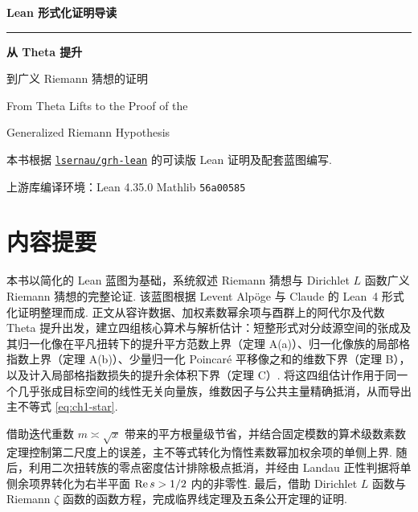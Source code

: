 \begin{titlepage}
\thispagestyle{empty}
\sffamily
\setlength{\parindent}{0pt}
\vspace*{0.02\textheight}

{\large\bfseries\color{DefinitionInk} Lean 形式化证明导读\par}
\vspace{0.55em}
{\color{DefinitionInk}\rule{27mm}{1pt}\par}
\vspace{1.35em}

{\fontsize{29pt}{38pt}\linespread{1.08}\selectfont\bfseries\color{OxfordNavy}
 从 Theta 提升\par
 到广义 Riemann 猜想的证明\par}
\vspace{0.75em}

{\Large\rmfamily\color{SlateInk}
 From Theta Lifts to the Proof of the\par
 Generalized Riemann Hypothesis\par}
\vspace{1.65em}

{\normalsize\rmfamily\color{SlateInk}
 本书根据 \href{https://github.com/lsernau/grh-lean}{\texttt{lsernau/grh-lean}}
 的可读版 Lean 证明及配套蓝图编写.\par}
\vspace{0.35em}
{\small\sffamily\color{SlateInk!75}
 上游库编译环境：Lean 4.35.0\quad\textperiodcentered\quad
 Mathlib \texttt{56a00585}\par}

\vfill
{\graphicspath{{figures/}}%
 \noindent\par}
\end{titlepage}


\chapter*{内容提要}

本书以简化的 Lean 蓝图为基础，系统叙述 Riemann 猜想与 Dirichlet $L$ 函数广义 Riemann 猜想的完整论证. 该蓝图根据 Levent Alpöge 与 Claude 的 Lean~4 形式化证明整理而成. 正文从容许数据、加权素数幂余项与酉群上的阿代尔及代数 Theta 提升出发，建立四组核心算术与解析估计：短整形式对分歧源空间的张成及其归一化像在平凡扭转下的提升平方范数上界（定理 A(a)）、归一化像族的局部格指数上界（定理 A(b)）、少量归一化 Poincaré 平移像之和的维数下界（定理 B），以及计入局部格指数损失的提升余体积下界（定理 C）. 将这四组估计作用于同一个几乎张成目标空间的线性无关向量族，维数因子与公共主量精确抵消，从而导出主不等式 \eqref{eq:ch1-star}.

借助迭代重数 $m\asymp\sqrt{x}$ 带来的平方根量级节省，并结合固定模数的算术级数素数定理控制第二尺度上的误差，主不等式转化为惰性素数幂加权余项的单侧上界. 随后，利用二次扭转族的零点密度估计排除极点抵消，并经由 Landau 正性判据将单侧余项界转化为右半平面 $\operatorname{Re} s>1/2$ 内的非零性. 最后，借助 Dirichlet $L$ 函数与 Riemann $\zeta$ 函数的函数方程，完成临界线定理及五条公开定理的证明.

\cleardoublepage
{}
\tableofcontents
